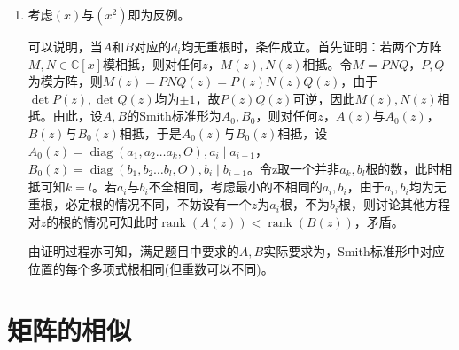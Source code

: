 \documentclass[a4paper,UTF8,fontset=windows]{ctexart}
\DeclareMathOperator{\diag}{diag}
\DeclareMathOperator{\rank}{rank}
\begin{document}
\begin{enumerate}
\item
考虑$(x)$与$(x^2)$即为反例。

可以说明，当$A$和$B$对应的$d_i$均无重根时，条件成立。首先证明：若两个方阵$M,N\in\mathbb{C}[x]$模相抵，则对任何$z$，$M(z),N(z)$相抵。令$M=PNQ$，$P,Q$为模方阵，则$M(z)=PNQ(z)=P(z)N(z)Q(z)$，由于$\det{P(z)},\det{Q(z)}$均为$\pm1$，故$P(z)Q(z)$可逆，因此$M(z),N(z)$相抵。由此，设$A,B$的Smith标准形为$A_0,B_0$，则对任何$z$，$A(z)$与$A_0(z)$，$B(z)$与$B_0(z)$相抵，于是$A_0(z)$与$B_0(z)$相抵，设$A_0(z)=\diag(a_1,a_2\dots a_k,O),a_i\mid a_{i+1}$，$B_0(z)=\diag(b_1,b_2\dots b_l,O),b_i\mid b_{i+1}$。令z取一个并非$a_k,b_l$根的数，此时相抵可知$k=l$。若$a_i$与$b_i$不全相同，考虑最小的不相同的$a_i,b_i$，由于$a_i,b_i$均为无重根，必定根的情况不同，不妨设有一个$z$为$a_i$根，不为$b_i$根，则讨论其他方程对$z$的根的情况可知此时$\rank(A(z))<\rank(B(z))$，矛盾。

由证明过程亦可知，满足题目中要求的$A,B$实际要求为，Smith标准形中对应位置的每个多项式根相同(但重数可以不同)。
\end{enumerate}

\section{矩阵的相似}
\end{document}
